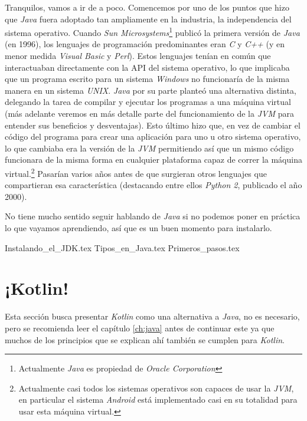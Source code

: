     Tranquilos, vamos a ir de a poco.
    Comencemos por uno de los puntos que hizo que \textit{Java} fuera adoptado tan ampliamente en la
    industria, la independencia del sistema operativo.
    Cuando \textit{Sun Microsystems}\footnote{Actualmente \textit{Java} es propiedad de 
    \textit{Oracle Corporation}} publicó la primera versión de \textit{Java} (en 1996), los 
    lenguajes de programación predominantes eran \textit{C} y \textit{C++} (y en menor medida 
    \textit{Visual Basic} y \textit{Perl}).
    Estos lenguajes tenían en común que interactuaban directamente con la API del sistema operativo,
    lo que implicaba que un programa escrito para un sistema \textit{Windows} no funcionaría de la
    misma manera en un sistema \textit{UNIX}.
    \textit{Java} por su parte planteó una alternativa distinta, delegando la tarea de compilar y 
    ejecutar los programas a una máquina virtual (más adelante veremos en más detalle parte del 
    funcionamiento de la \textit{JVM} para entender sus beneficios y desventajas).
    Esto último hizo que, en vez de cambiar el código del programa para crear una aplicación para 
    uno u otro sistema operativo, lo que cambiaba era la versión de la \textit{JVM} permitiendo así
    que un mismo código funcionara de la misma forma en cualquier plataforma capaz de correr la 
    máquina virtual.\footnote{Actualmente casi todos los sistemas operativos son capaces de usar la 
    \textit{JVM}, en particular el sistema \textit{Android} está implementado casi en su totalidad 
    para usar esta máquina virtual.}
    Pasarían varios años antes de que surgieran otros lenguajes que compartieran esa característica
    (destacando entre ellos \textit{Python 2}, publicado el año 2000).

    No tiene mucho sentido seguir hablando de \textit{Java} si no podemos poner en práctica lo que 
    vayamos aprendiendo, así que es un buen momento para instalarlo.
    
    {Instalando_el_JDK.tex}
    {Tipos_en_Java.tex}
    {Primeros_pasos.tex}
  
    \nocite{*}
    \printbibliography[keyword=java]
  
  \chapter{¡Kotlin!}
    Esta sección busca presentar \textit{Kotlin} como una alternativa a \textit{Java}, no es 
    necesario, pero se recomienda leer el capítulo \ref{ch:java} antes de continuar este ya que 
    muchos de los principios que se explican ahí también se cumplen para \textit{Kotlin}.
    
